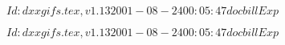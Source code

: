 \documentclass{article}
\begin{document}
$Id: dxxgifs.tex,v 1.13 2001-08-24 00:05:47 docbill Exp $


\pagebreak


$Id: dxxgifs.tex,v 1.13 2001-08-24 00:05:47 docbill Exp $


\pagebreak
\end{document}
